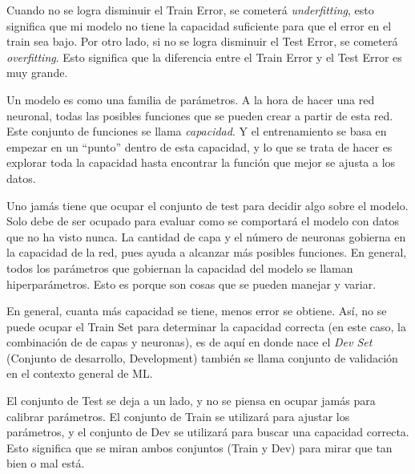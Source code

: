 Cuando no se logra disminuir el Train Error, se cometerá \textit{underfitting}, esto significa que mi modelo no tiene la capacidad suficiente para que el error en el train sea bajo. Por otro lado, si no se logra disminuir el Test Error, se cometerá \textit{overfitting}. Esto significa que la diferencia entre el Train Error y el Test Error es muy grande.

Un modelo es como una familia de parámetros. A la hora de hacer una red neuronal, todas las posibles funciones que se pueden crear a partir de esta red. Este conjunto de funciones se llama \textit{capacidad}. Y el entrenamiento se basa en empezar en un ``punto'' dentro de esta capacidad, y lo que se trata de hacer es explorar toda la capacidad hasta encontrar la función que mejor se ajusta a los datos.

Uno jamás tiene que ocupar el conjunto de test para decidir algo sobre el modelo. Solo debe de ser ocupado para evaluar como se comportará el modelo con datos que no ha visto nunca. La cantidad de capa y el número de neuronas gobierna en la capacidad de la red, pues ayuda a alcanzar más posibles funciones. En general, todos los parámetros que gobiernan la capacidad del modelo se llaman hiperparámetros. Esto es porque son cosas que se pueden manejar y variar. 

En general, cuanta más capacidad se tiene, menos error se obtiene. Así, no se puede ocupar el Train Set para determinar la capacidad correcta (en este caso, la combinación de de capas y neuronas), es de aquí en donde nace el \textit{Dev Set} (Conjunto de desarrollo, Development) también se llama conjunto de validación en el contexto general de ML.

El conjunto de Test se deja a un lado, y no se piensa en ocupar jamás para calibrar parámetros. El conjunto de Train se utilizará para ajustar los parámetros, y el conjunto de Dev se utilizará para buscar una capacidad correcta. Esto significa que se miran ambos conjuntos (Train y Dev) para mirar que tan bien o mal está. 

